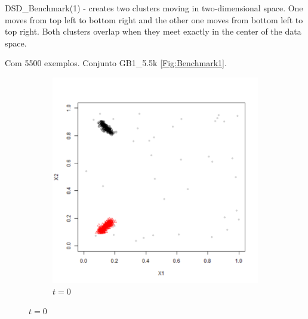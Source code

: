 DSD\_Benchmark(1) - creates two clusters moving in two-dimensional space. One moves from top left to bottom right and the other one moves from bottom left to top right. Both clusters overlap when they meet exactly in the center of the data space.

Com 5500 exemplos. Conjunto GB1\_5.5k \autoref{Fig:Benchmark1}.

\begin{figure}[!htb]
        \centering
        \begin{subfigure}[t]{0.25\textwidth}
                \includegraphics[page=1,width=\textwidth]{figures/datasets/Benchmark1_5500}
                \caption{$t = 0$}
                \label{Fig:Benchmark1_11}
        \end{subfigure}%
        \qquad %

\end{figure}
